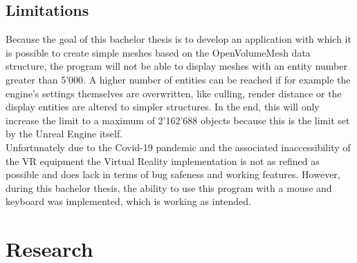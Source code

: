 \documentclass{report}
\begin{document}
	\section{Limitations}
	\startsection
		Because the goal of this bachelor thesis is to develop an application with which it is possible to create simple meshes based on the OpenVolumeMesh data structure, the program will not be able to display meshes with an entity number greater than 5'000. A higher number of entities can be reached if for example the engine's settings themselves are overwritten, like culling, render distance or the display entities are altered to simpler structures. In the end, this will only increase the limit to a maximum of 2'162'688 objects because this is the limit set by the Unreal Engine itself. \\
		Unfortunately due to the Covid-19 pandemic and the associated inaccessibility of the VR equipment the Virtual Reality implementation is not as refined as possible and does lack in terms of bug safeness and working features. However, during this bachelor thesis, the ability to use this program with a mouse and keyboard was implemented, which is working as intended.
	\closesection
	

\chapter{Research}
\end{document}
